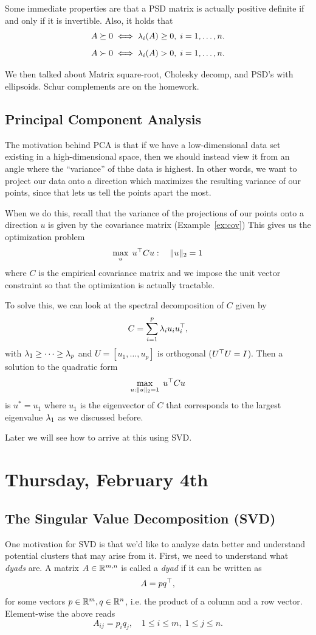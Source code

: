 \documentclass[11 pt]{scrartcl}
\begin{document}
Some immediate properties are that a PSD matrix is actually positive definite if and only if it is invertible. 
Also, it holds that 
\[ A \succeq 0 \iff \lambda_i(A) \geq 0,\; i=1, \dots, n.\] 
\[ A \succ   0 \iff \lambda_i(A) > 0,\; i=1, \dots, n.\] 

We then talked about Matrix square-root, Cholesky decomp, and PSD's with ellipsoids. 
Schur complements are on the homework.

\subsection{Principal Component Analysis}

The motivation behind PCA is that if we have a low-dimensional data set existing in a high-dimensional space, then we should instead view it from an angle where the ``variance'' of thhe data is highest. 
In other words, we want to project our data onto a direction which maximizes the resulting variance of our points, since that lets us tell the points apart the most. 

When we do this, recall that the variance of the projections of our points onto a direction $u$ is given by the covariance matrix (Example~\ref{ex:cov})
This gives us the optimization problem 
\[ \max_u\; u^\top C u: \quad \|u\|_2 = 1\] 
where $C$ is the empirical covariance matrix and we impose the unit vector constraint so that the optimization is actually tractable. 

To solve this, we can look at the spectral decomposition of $C$ given by 
\[ C = \sum_{i=1}^p \lambda_i u_i u_i^\top,\] 
with $\lambda_1 \geq \dots \geq \lambda_p$ and $U = [u_1,\dots, u_p]$ is orthogonal ($U^\top U = I$). Then a solution to the quadratic form 
\[ \max_{u: \|u\|_2=1} \; u^\top C u\] 
is $u^* = u_1$ where $u_1$ is the eigenvector of $C$ that corresponds to the largest eigenvalue $\lambda_1$ as we discussed before. 

Later we will see how to arrive at this using SVD. 


\newpage
\section{Thursday, February 4th}

\subsection{The Singular Value Decomposition (SVD)}
One motivation for SVD is that we'd like to analyze data better and understand potential clusters that may arise from it. 
First, we need to understand what \emph{dyads} are. 
A matrix $A\in \mathbb R^{m,n}$ is called a \emph{dyad} if it can be written as 
\[ A = pq^\top,\] 
for some vectors $p\in \mathbb R^m, q\in \mathbb R^n$, i.e. the product of a column and a row vector.
Element-wise the above reads 
\[ A_{ij} = p_iq_j, \quad 1\leq i\leq m,\; 1\leq j \leq n.\] 
\end{document}
